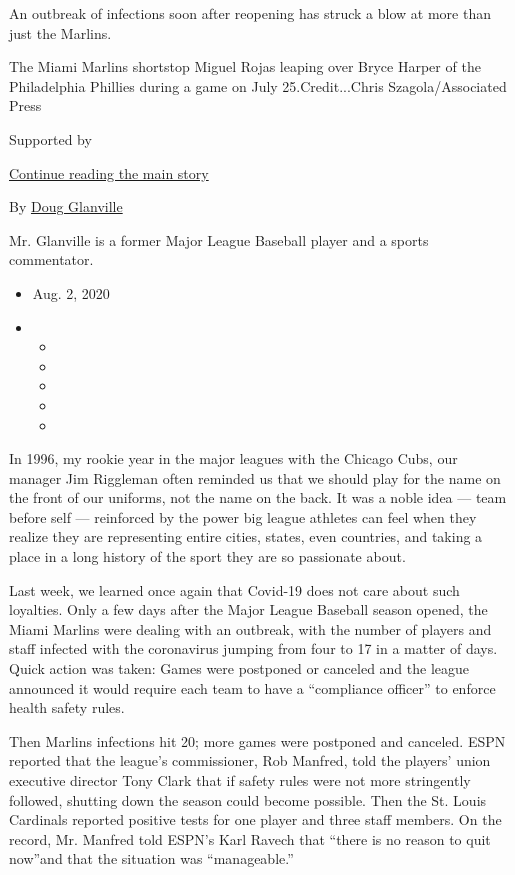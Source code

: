 An outbreak of infections soon after reopening has struck a blow at more
than just the Marlins.

The Miami Marlins shortstop Miguel Rojas leaping over Bryce Harper of
the Philadelphia Phillies during a game on July 25.Credit...Chris
Szagola/Associated Press

Supported by

\protect\hyperlink{after-sponsor}{Continue reading the main story}

By \href{https://www.nytimes3xbfgragh.onion/by/doug-glanville}{Doug
Glanville}

Mr. Glanville is a former Major League Baseball player and a sports
commentator.

\begin{itemize}
\item
  Aug. 2, 2020
\item
  \begin{itemize}
  \item
  \item
  \item
  \item
  \item
  \end{itemize}
\end{itemize}

In 1996, my rookie year in the major leagues with the Chicago Cubs, our
manager Jim Riggleman often reminded us that we should play for the name
on the front of our uniforms, not the name on the back. It was a noble
idea --- team before self --- reinforced by the power big league
athletes can feel when they realize they are representing entire cities,
states, even countries, and taking a place in a long history of the
sport they are so passionate about.

Last week, we learned once again that Covid-19 does not care about such
loyalties. Only a few days after the Major League Baseball season
opened, the Miami Marlins were dealing with an outbreak, with the number
of players and staff infected with the coronavirus jumping from four to
17 in a matter of days. Quick action was taken: Games were postponed or
canceled and the league announced it would require each team to have a
``compliance officer'' to enforce health safety rules.

Then Marlins infections hit 20; more games were postponed and canceled.
ESPN reported that the league's commissioner, Rob Manfred, told the
players' union executive director Tony Clark that if safety rules were
not more stringently followed, shutting down the season could become
possible. Then the St. Louis Cardinals reported positive tests for one
player and three staff members. On the record, Mr. Manfred told ESPN's
Karl Ravech that ``there is no reason to quit now''and that the
situation was ``manageable.''

